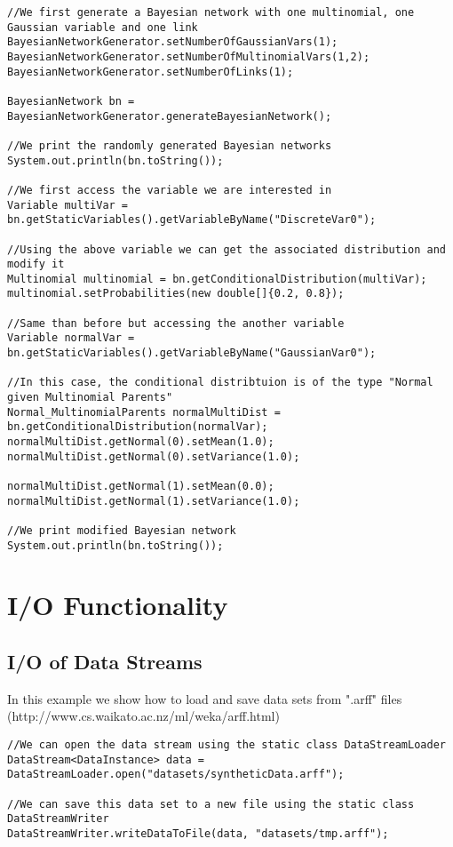\begin{lstlisting}
//We first generate a Bayesian network with one multinomial, one Gaussian variable and one link
BayesianNetworkGenerator.setNumberOfGaussianVars(1);
BayesianNetworkGenerator.setNumberOfMultinomialVars(1,2);
BayesianNetworkGenerator.setNumberOfLinks(1);

BayesianNetwork bn = BayesianNetworkGenerator.generateBayesianNetwork();

//We print the randomly generated Bayesian networks
System.out.println(bn.toString());

//We first access the variable we are interested in
Variable multiVar = bn.getStaticVariables().getVariableByName("DiscreteVar0");

//Using the above variable we can get the associated distribution and modify it
Multinomial multinomial = bn.getConditionalDistribution(multiVar);
multinomial.setProbabilities(new double[]{0.2, 0.8});

//Same than before but accessing the another variable
Variable normalVar = bn.getStaticVariables().getVariableByName("GaussianVar0");

//In this case, the conditional distribtuion is of the type "Normal given Multinomial Parents"
Normal_MultinomialParents normalMultiDist = bn.getConditionalDistribution(normalVar);
normalMultiDist.getNormal(0).setMean(1.0);
normalMultiDist.getNormal(0).setVariance(1.0);

normalMultiDist.getNormal(1).setMean(0.0);
normalMultiDist.getNormal(1).setVariance(1.0);

//We print modified Bayesian network
System.out.println(bn.toString());

\end{lstlisting}


\section{I/O Functionality}

\subsection{I/O of Data Streams}

In this example we show how to load and save data sets from ".arff" files (http://www.cs.waikato.ac.nz/ml/weka/arff.html)

\begin{lstlisting}
//We can open the data stream using the static class DataStreamLoader
DataStream<DataInstance> data = DataStreamLoader.open("datasets/syntheticData.arff");

//We can save this data set to a new file using the static class DataStreamWriter
DataStreamWriter.writeDataToFile(data, "datasets/tmp.arff");
\end{lstlisting}

